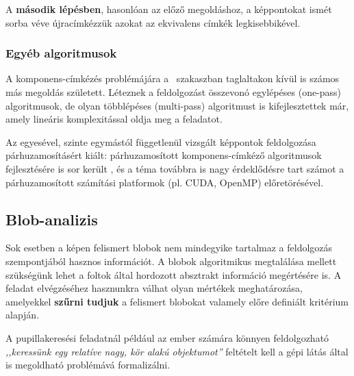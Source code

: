 A \textbf{második lépésben}, hasonlóan az előző megoldáshoz, a képpontokat ismét sorba véve újracímkézzük azokat az ekvivalens címkék legkisebbikével.

\subsubsection{Egyéb algoritmusok}\label{sect:blob_egyeb}

A komponens-címkézés problémájára a ~szakaszban taglaltakon kívül is számos más megoldás született. Léteznek a feldolgozást összevonó egylépéses (one-pass) algoritmusok, de olyan többlépéses (multi-pass) algoritmust is kifejlesztettek már, amely lineáris komplexitással oldja meg a feladatot. \cite{suzuki_lin}

Az egyesével, szinte egymástól függetlenül vizsgált képpontok feldolgozása párhuzamosításért kiált: párhuzamosított komponens-címkéző algoritmusok fejlesztésére is sor került \cite{comp_parallel}, és a téma továbbra is nagy érdeklődésre tart számot a párhuzamosított számítási platformok (pl. CUDA, OpenMP) előretörésével.

\subsection{Blob-analizis}\label{sect:blob_analizis}

Sok esetben a képen felismert blobok nem mindegyike tartalmaz a feldolgozás szempontjából hasznos információt. A blobok algoritmikus megtalálása mellett szükségünk lehet a foltok által hordozott absztrakt információ megértésére is. A feladat elvégzéséhez hasznunkra válhat olyan mértékek meghatározása, amelyekkel \textbf{szűrni tudjuk} a felismert blobokat valamely előre definiált kritérium alapján.

A pupillakeresési feladatnál például az ember számára könnyen feldolgozható \emph{,,keressünk egy relatíve nagy, kör alakú objektumot''} feltételt kell a gépi látás által is megoldható problémává formalizálni.

